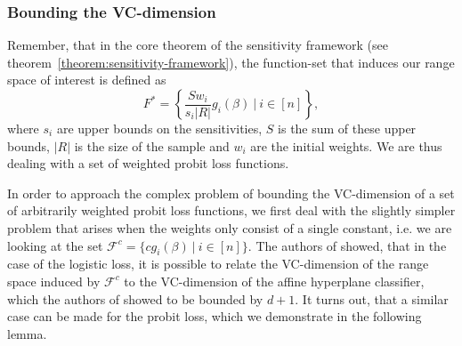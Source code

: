 \subsubsection{Bounding the VC-dimension}

Remember, that in the core theorem of the sensitivity
framework (see theorem~\ref{theorem:sensitivity-framework}),
the function-set that induces our range space of interest
is defined as
\begin{equation*}
    F^\ast = \left\{ \frac{S w_i}{s_i |R|} g_i(\beta) \ |\ i \in [n] \right\},
\end{equation*}
where $s_i$ are upper bounds on the sensitivities, $S$ is the
sum of these upper bounds, $|R|$ is the size of the sample and
$w_i$ are the initial weights.
We are thus dealing with a set of weighted probit loss functions.

In order to approach the complex problem of bounding the VC-dimension
of a set of arbitrarily weighted probit loss functions, we first
deal with the slightly simpler problem that arises when the weights
only consist of a single constant, i.e. we are looking at the
set $\mathcal{F}^c = \{ c g_i(\beta) \ | \ i \in [n] \}$.
The authors of \cite{scalable-bayesian-logreg} showed, that
in the case of the logistic loss,
it is possible to relate the VC-dimension of the
range space induced by $\mathcal{F}^c$ to the VC-dimension of
the affine hyperplane classifier, which the authors of
\cite{computational-learning-theory} showed to be bounded by $d + 1$.
It turns out, that a similar case can be made for the probit
loss, which we demonstrate in the following lemma.


